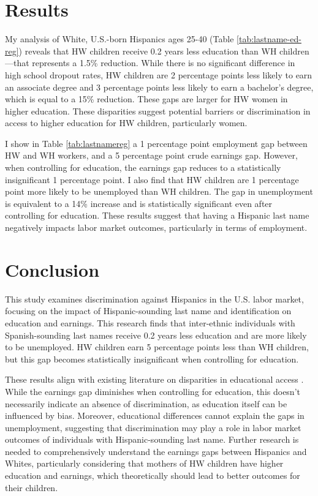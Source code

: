 \documentclass[a4paper,fleqn]{cas-sc}
\begin{document}
\section{Results}\label{sec:results}

My analysis of White, U.S.-born Hispanics ages 25-40 (Table \ref{tab:lastname-ed-reg}) reveals that HW children receive 0.2 years less education than WH children---that represents a 1.5\% reduction. While there is no significant difference in high school dropout rates, HW children are 2 percentage points less likely to earn an associate degree and 3 percentage points less likely to earn a bachelor's degree, which is equal to a 15\% reduction. These gaps are larger for HW women in higher education. These disparities suggest potential barriers or discrimination in access to higher education for HW children, particularly women.

I show in Table \ref{tab:lastnamereg} a 1 percentage point employment gap between HW and WH workers, and a 5 percentage point crude earnings gap. However, when controlling for education, the earnings gap reduces to a statistically insignificant 1 percentage point. I also find that HW children are 1 percentage point more likely to be unemployed than WH children. The gap in unemployment is equivalent to a 14\% increase and is statistically significant even after controlling for education. These results suggest that having a Hispanic last name negatively impacts labor market outcomes, particularly in terms of employment.

\section{Conclusion}\label{sec:con1}

This study examines discrimination against Hispanics in the U.S. labor market, focusing on the impact of Hispanic-sounding last name and identification on education and earnings. This research finds that inter-ethnic individuals with Spanish-sounding last names receive 0.2 years less education and are more likely to be unemployed. HW children earn 5 percentage points less than WH children, but this gap becomes statistically insignificant when controlling for education.

These results align with existing literature on disparities in educational access \citep{bergman2018education,gaddis2024racial}. While the earnings gap diminishes when controlling for education, this doesn't necessarily indicate an absence of discrimination, as education itself can be influenced by bias. Moreover, educational differences cannot explain the gaps in unemployment, suggesting that discrimination may play a role in labor market outcomes of individuals with Hispanic-sounding last name. Further research is needed to comprehensively understand the earnings gaps between Hispanics and Whites, particularly considering that mothers of HW children have higher education and earnings, which theoretically should lead to better outcomes for their children.
\end{document}
